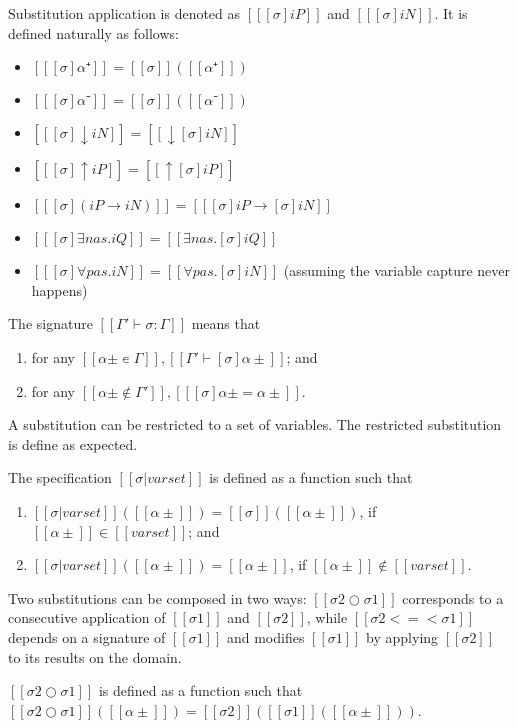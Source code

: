 \begin{algorithm}
  Substitution application is denoted as $[[ [σ]iP ]]$ and $[[ [σ]iN ]]$.
  It is defined naturally as follows:
    \begin{multicols}{2}
      \begin{itemize}
        \item[] $[[ [σ]α⁺ ]] = [[σ]] ([[α⁺]])$
        \item[] $[[ [σ]α⁻ ]] = [[σ]] ([[α⁻]])$
        \item[] $[[ [σ]↓iN ]] = [[↓[σ]iN]]$
        \item[] $[[ [σ]↑iP ]] = [[↑[σ]iP]]$
        \item[] $[[ [σ](iP → iN) ]] = [[ [σ]iP → [σ]iN ]]$
        \item[] $[[ [σ]∃nas.iQ ]] = [[∃nas.[σ]iQ]]$ 
        \item[] $[[ [σ]∀pas.iN ]] = [[∀pas.[σ]iN]]$ (assuming the variable capture never happens)
      \end{itemize}
    \end{multicols}
\end{algorithm}

\begin{definition}
  The signature $[[Γ' ⊢ σ : Γ]]$ means that
  \begin{enumerate}
    \item for any $[[α± ∊ Γ]], [[ Γ' ⊢ [σ]α± ]]$; and
    \item for any $[[α± ∉ Γ']], [[ [σ]α± = α± ]]$.
  \end{enumerate}
\end{definition}

A substitution can be restricted to a set of variables. 
The restricted substitution is define as expected. 
\begin{definition}
  The specification $[[σ  | varset]]$ is defined as
  a function such that 
  \begin{enumerate}
    \item $[[σ|varset]]([[α± ]]) = [[σ]]([[α± ]])$, if $[[α± ]] \in [[varset]]$; and
    \item $[[σ|varset]]([[α± ]]) = [[α± ]]$, if $[[α± ]] \notin [[varset]]$.
  \end{enumerate}
\end{definition}

Two substitutions can be composed in two ways:
$[[σ2 ○ σ1]]$ corresponds to a consecutive application of $[[σ1]]$ and $[[σ2]]$,
while $[[σ2 <=< σ1]]$
depends on a signature of $[[σ1]]$ and modifies $[[σ1]]$ by applying
$[[σ2]]$ to its results on the domain.
\begin{definition}
  $[[σ2 ○ σ1]]$ is defined as a function such that
  $[[σ2 ○ σ1]]([[α± ]]) = [[σ2]]([[σ1]]([[α± ]]))$.
\end{definition}

